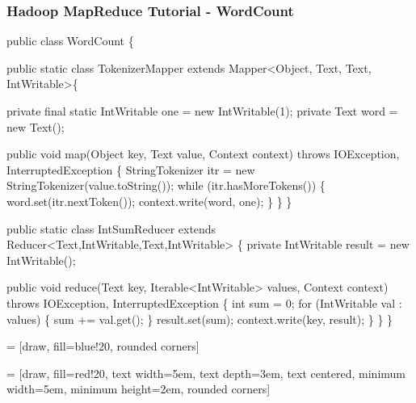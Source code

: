 \documentclass{beamer}
\begin{document}
\begin{frame}[fragile]
\frametitle{Hadoop MapReduce Tutorial - WordCount}
\begin{semiverbatim}
\tiny public class WordCount \{

  public static class TokenizerMapper
       extends Mapper<Object, Text, Text, IntWritable>\{

    private final static IntWritable one = new IntWritable(1);
    private Text word = new Text();

    public void map(Object key, Text value, Context context)
                     throws IOException, InterruptedException \{
      StringTokenizer itr = new StringTokenizer(value.toString());
      while (itr.hasMoreTokens()) \{
        word.set(itr.nextToken());
        context.write(word, one);
      \}
    \}
  \}

  public static class IntSumReducer
       extends Reducer<Text,IntWritable,Text,IntWritable> \{
    private IntWritable result = new IntWritable();

    public void reduce(Text key, Iterable<IntWritable> values, Context context)
                        throws IOException, InterruptedException \{
      int sum = 0;
      for (IntWritable val : values) \{
        sum += val.get();
      \}
      result.set(sum);
      context.write(key, result);
    \}
  \}
\}
\end{semiverbatim}
\end{frame}


 = [draw, fill=blue!20, rounded corners]

 = [draw, fill=red!20, text width=5em, text depth=3em, text centered,
  minimum width=5em, minimum height=2em, rounded corners]

%

\newcommand\task[4]{
\matrix (#1) [task, inner xsep=0] at (#2) { \node {\IfSubStr{#3}{u}{}{#1}}; \\ #4


\foreach \i in {-7,...,7}
{
\IfSubStr{#3}{l}{
  \draw[xshift=-5em, ultra thick] (0,0.2 * \i)  coordinate (#1 Port \i) -- (0.2,0.2 * \i);
}{
  \draw[xshift=-5em, ultra thick, color=blue!20] (0,0.2 * \i) -- (0.2,0.2 * \i);
}
\IfSubStr{#3}{r}{
  \draw[xshift=5em, ultra thick] (-0.2,0.2 * \i) -- (0,0.2 * \i) coordinate (#1 Port \i);
}{
  \draw[xshift=5em, ultra thick, color=blue!20] (-0.2,0.2 * \i) -- (0,0.2 * \i);
}
}

\\};
}
\end{document}
